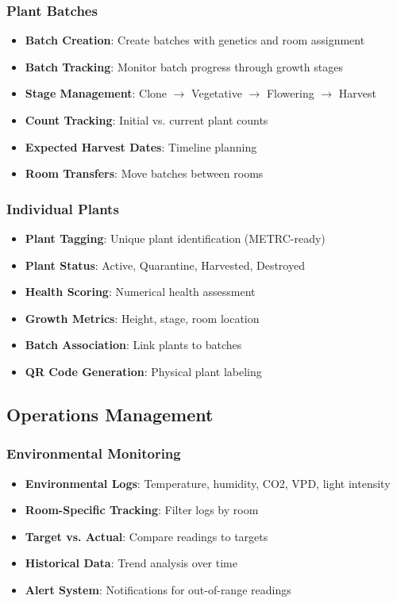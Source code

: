 \documentclass[11pt,a4paper]{article}
\begin{document}
\subsubsection{Plant Batches}
\begin{itemize}
    \item \textbf{Batch Creation}: Create batches with genetics and room assignment
    \item \textbf{Batch Tracking}: Monitor batch progress through growth stages
    \item \textbf{Stage Management}: Clone $\rightarrow$ Vegetative $\rightarrow$ Flowering $\rightarrow$ Harvest
    \item \textbf{Count Tracking}: Initial vs. current plant counts
    \item \textbf{Expected Harvest Dates}: Timeline planning
    \item \textbf{Room Transfers}: Move batches between rooms
\end{itemize}

\subsubsection{Individual Plants}
\begin{itemize}
    \item \textbf{Plant Tagging}: Unique plant identification (METRC-ready)
    \item \textbf{Plant Status}: Active, Quarantine, Harvested, Destroyed
    \item \textbf{Health Scoring}: Numerical health assessment
    \item \textbf{Growth Metrics}: Height, stage, room location
    \item \textbf{Batch Association}: Link plants to batches
    \item \textbf{QR Code Generation}: Physical plant labeling
\end{itemize}

\subsection{Operations Management}

\subsubsection{Environmental Monitoring}
\begin{itemize}
    \item \textbf{Environmental Logs}: Temperature, humidity, CO2, VPD, light intensity
    \item \textbf{Room-Specific Tracking}: Filter logs by room
    \item \textbf{Target vs. Actual}: Compare readings to targets
    \item \textbf{Historical Data}: Trend analysis over time
    \item \textbf{Alert System}: Notifications for out-of-range readings
\end{itemize}
\end{document}
